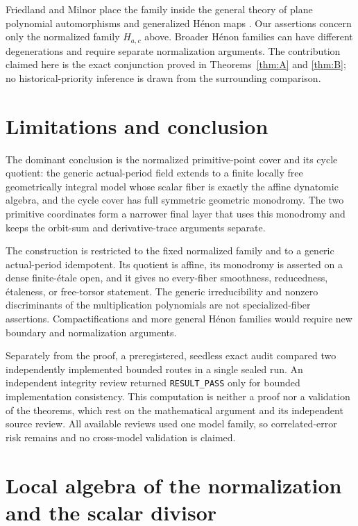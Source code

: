\documentclass[11pt]{article}
\theoremstyle{definition}
\theoremstyle{remark}
\newcommand{\etale}{\'{e}tale}
\newcommand{\etaleness}{\'{e}taleness}
\begin{document}
Friedland and Milnor place the family inside the general theory of plane
polynomial automorphisms and generalized H\'{e}non maps
\citep{friedland-milnor-1989-plane-automorphisms}.  Our assertions concern
only the normalized family $H_{a,c}$ above.  Broader H\'{e}non families can
have different degenerations and require separate normalization arguments.
The contribution claimed here is the exact conjunction proved in
Theorems~\ref{thm:A} and \ref{thm:B}; no historical-priority inference is
drawn from the surrounding comparison.

\section{Limitations and conclusion}\label{sec:conclusion}

The dominant conclusion is the normalized primitive-point cover and its
cycle quotient: the generic actual-period field extends to a finite locally
free geometrically integral model whose scalar fiber is exactly the affine
dynatomic algebra, and the cycle cover has full symmetric geometric
monodromy.  The two primitive coordinates form a narrower final layer that
uses this monodromy and keeps the orbit-sum and derivative-trace arguments
separate.

The construction is restricted to the fixed normalized family and to a
generic actual-period idempotent.  Its quotient is affine, its monodromy is
asserted on a dense finite-\etale{} open, and it gives no every-fiber
smoothness, reducedness, \etaleness, or free-torsor statement.  The generic
irreducibility and nonzero discriminants of the multiplication polynomials
are not specialized-fiber assertions.  Compactifications and more general
H\'{e}non families would require new boundary and normalization arguments.

Separately from the proof, a preregistered, seedless exact audit compared two independently implemented bounded routes in a single sealed run. An independent integrity review returned \texttt{RESULT\_PASS} only for bounded implementation consistency. This computation is neither a proof nor a validation of the theorems, which rest on the mathematical argument and its independent source review. All available reviews used one model family, so correlated-error risk remains and no cross-model validation is claimed.

\appendix

\section{Local algebra of the normalization and the scalar divisor}
\label{app:local}
\end{document}
